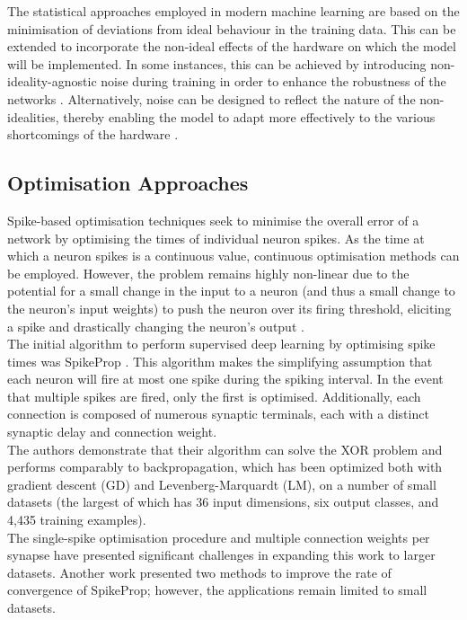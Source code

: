 \noindent The statistical approaches employed in modern machine learning are based on the minimisation of deviations from ideal behaviour in the training data. This can be extended to incorporate the non-ideal effects of the hardware on which the model will be implemented. In some instances, this can be achieved by introducing non-ideality-agnostic noise during training in order to enhance the robustness of the networks \cite{ye2023improving}. Alternatively, noise can be designed to reflect the nature of the non-idealities, thereby enabling the model to adapt more effectively to the various shortcomings of the hardware \cite{huang2021method}.

\subsection[Optimisation Approaches]{Optimisation Approaches}

Spike-based optimisation techniques seek to minimise the overall error of a network by optimising the times of individual neuron spikes. As the time at which a neuron spikes is a continuous value, continuous optimisation methods can be employed. However, the problem remains highly non-linear due to the potential for a small change in the input to a neuron (and thus a small change to the neuron's input weights) to push the neuron over its firing threshold, eliciting a spike and drastically changing the neuron's output \cite{gutig2014spike}. \\

\noindent The initial algorithm to perform supervised deep learning by optimising spike times was SpikeProp \cite{bohte2002error}. This algorithm makes the simplifying assumption that each neuron will fire at most one spike during the spiking interval. In the event that multiple spikes are fired, only the first is optimised. Additionally, each connection is composed of numerous synaptic terminals, each with a distinct synaptic delay and connection weight. \\

\noindent The authors demonstrate that their algorithm can solve the XOR problem and performs comparably to backpropagation, which has been optimized both with gradient descent (GD) and Levenberg-Marquardt (LM), on a number of small datasets (the largest of which has 36 input dimensions, six output classes, and 4,435 training examples). \\

\noindent The single-spike optimisation procedure and multiple connection weights per synapse have presented significant challenges in expanding this work to larger datasets. Another work \cite{mckennoch2006fast} presented two methods to improve the rate of convergence of SpikeProp; however, the applications remain limited to small datasets. \\


